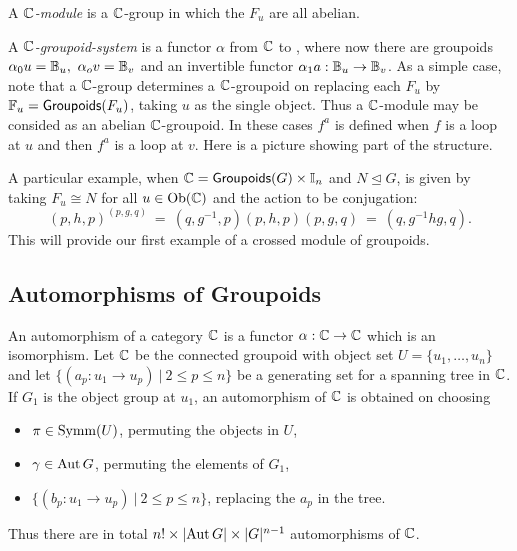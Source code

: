 A \emph{$\mathbb{C}$-module} is a $\mathbb{C}$-group in which the $F_u$ are all abelian. 

A \emph{$\mathbb{C}$-groupoid-system} is a functor 
$\alpha$ from $\mathbb{C}$ to \catGpd, 
where now there are groupoids $\alpha_0u = \mathbb{B}_u,~ \alpha_ov = \mathbb{B}_v$ 
and an invertible functor $\alpha_1a : \mathbb{B}_u \to \mathbb{B}_v$. 
As a simple case, note that a $\mathbb{C}$-group determines a $\mathbb{C}$-groupoid 
on replacing each $F_u$ by $\mathbb{F}_u = {\sf Groupoids}(F_u)$, 
taking $u$ as the single object. 
Thus a $\mathbb{C}$-module may be consided as an abelian $\mathbb{C}$-groupoid. 
In these cases $f^a$ is defined when $f$ is a loop at $u$ 
and then $f^a$ is a loop at $v$. 
Here is a picture showing part of the structure.

\begin{figure}[htbp]
\begin{center}

\label{figure:gpd-gps}
\end{center}
\end{figure}

A particular example, when $\mathbb{C}={\sf Groupoids}(G)\times\mathbb{I}_n$ and $N \unlhd G$, 
is given by taking $F_u \cong N$ for all $u \in \mathrm{Ob}(\mathbb{C})$ and the action 
to be conjugation:
\begin{equation} \label{eq:gpd-conj}
(p,h,p)^{(p,g,q)} ~=~ (q,g^{-1},p)(p,h,p)(p,g,q) ~=~ (q,g^{-1}hg,q). 
\end{equation}
This will provide our first example of a crossed module of groupoids. 



\newpage
\subsection{Automorphisms of Groupoids}

An automorphism of a category $\mathbb{C}$ is a functor $\alpha : \mathbb{C} \to \mathbb{C}$ 
which is an isomorphism. 
Let $\mathbb{C}$ be the connected groupoid with object set $U=\{u_1,\ldots,u_n\}$ 
and let $\{(a_p : u_1 \to u_p) ~|~ 2 \leqslant p \leqslant n\}$ 
be a generating set for a spanning tree in $\mathbb{C}$. 
If $G_1$ is the object group at $u_1$, 
an automorphism of $\mathbb{C}$ is obtained on choosing 
\begin{itemize}
\item
$\pi \in \mathrm{Symm}(U)$, permuting the objects in $U$, 
\item
$\gamma \in \mathrm{Aut}\,G$, permuting the elements of $G_1$, 
\item
$\{(b_p : u_1 \to u_p) ~|~ 2 \leqslant p \leqslant n\}$, 
replacing the $a_p$ in the tree. 
\end{itemize}
Thus there are in total $n! \times |\mathrm{Aut}\,G| \times |G|^{n-1}$ 
automorphisms of $\mathbb{C}$. 

